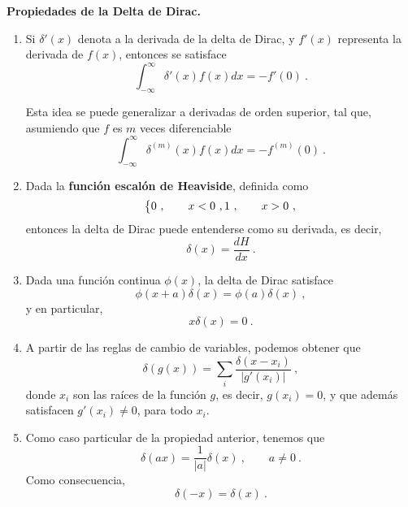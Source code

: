 \begin{propiedad}
    \textbf{Propiedades de la Delta de Dirac.}
    \begin{enumerate}
        \item Si $\delta'(x)$ denota a la derivada de la delta de Dirac, y $f'(x)$ representa la derivada de $f(x)$, entonces se satisface
        \begin{equation}
            \int_{-\infty}^{\infty} \delta'(x) f(x) dx = - f'(0) \ .
        \end{equation}

        Esta idea se puede generalizar a derivadas de orden superior, tal que, asumiendo que $f$ es $m$ veces diferenciable
        \begin{equation}
            \int_{-\infty}^{\infty} \delta^{(m)}(x) f(x) dx = - f^{(m)}(0) \ .
        \end{equation}

        \item Dada la \textbf{función escalón de Heaviside}, definida como
        \begin{equation}
            \begin{dcases}
                0 \ , \qquad x < 0 \ ,
                1 \ , \qquad x > 0 \ ,
            \end{dcases}
        \end{equation}
        entonces la delta de Dirac puede entenderse como su derivada, es decir,
        \begin{equation}
            \delta(x) = \frac{dH}{dx} \ .
        \end{equation}
        
        \item Dada una función continua $\phi(x)$, la delta de Dirac satisface
        \begin{equation}
            \phi(x+a) \delta(x) = \phi(a) \delta(x) \ ,
        \end{equation}
        y en particular,
        \begin{equation}
            x \delta(x) = 0 \ .
        \end{equation}
        \item A partir de las reglas de cambio de variables, podemos obtener que
        \begin{equation}
            \delta(g(x)) = \sum_i \frac{\delta(x-x_i)}{|g'(x_i)|} \ ,
        \end{equation}
        donde $x_i$ son las raíces de la función $g$, es decir, $g(x_i) = 0$, y que además satisfacen $g'(x_i) \neq 0$, para todo $x_i$.
        \item Como caso particular de la propiedad anterior, tenemos que
        \begin{equation}
            \delta(ax) = \frac{1}{|a|}\delta(x) \ , \qquad a \neq 0 \ .
        \end{equation}
        Como consecuencia,
        \begin{equation}
            \delta(-x) = \delta(x) \ .
        \end{equation}
    \end{enumerate}
\end{propiedad}

